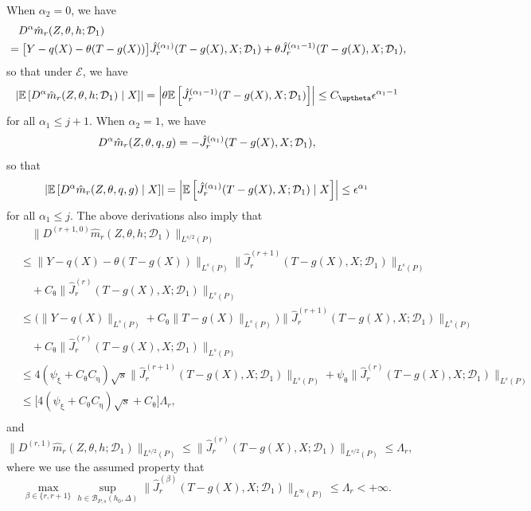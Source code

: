 \documentclass{article}
\def\eps{{\epsilon}}
\def\gB{{\mathcal{B}}}
\def\gD{{\mathcal{D}}}
\def\gE{{\mathcal{E}}}
\newcommand{\E}{\mathbb{E}}
\begin{document}
When $\alpha_2=0$, we have
\begin{equation}
    \notag
    \begin{aligned}
        &\quad D^{\alpha}\hat{m}_r(Z,\theta,h;\gD_1) \\
        &= \big[Y-q(X)-\theta(T-g(X))\big]\hat{J}_r^{(\alpha_1)}(T-g(X),X;\gD_1) + \theta \hat{J}_r^{(\alpha_1-1)}(T-g(X),X;\gD_1),
    \end{aligned}
\end{equation}
so that under $\gE$, we have
\begin{equation}
    \notag
    \left|\E\left[ D^{\alpha}\hat{m}_r(Z,\theta,h;\gD_1)\mid X\right]\right| = \left|\theta \E\left[ \hat{J}_r^{(\alpha_1-1)}(T-g(X),X;\gD_1) \right]\right| \leq C_{\uptheta}\eps^{\alpha_1-1}
\end{equation}
for all $\alpha_1 \leq j+1$. When $\alpha_2=1$, we have
\begin{equation}
    \notag
    D^{\alpha}\hat{m}_r(Z,\theta,q,g) = - \hat{J}_r^{(\alpha_1)}(T-g(X),X;\gD_1),
\end{equation}
so that
\begin{equation}
    \notag
    \left|\E\left[ D^{\alpha}\hat{m}_r(Z,\theta,q,g)\mid X\right]\right| = \left|\E\left[ \hat{J}_r^{(\alpha_1)}(T-g(X),X;\gD_1) \mid X \right]\right| \leq \eps^{\alpha_1}
\end{equation}
for all $\alpha_1 \leq j$. The above derivations also imply that
\begin{equation}
    \label{eq:Jk-derivative-sup-norm}
    \begin{aligned}
        &\quad \|D^{(r+1,0)}\hat{m}_r(Z,\theta,h;\gD_1)\|_{L^{s/2}(P)} \\
        &\leq \|Y-q(X)-\theta(T-g(X))\|_{L^s(P)}\|\hat{J}_r^{(r+1)}(T-g(X),X;\gD_1)\big\|_{L^{s}(P)} \\&\quad + C_{\uptheta}\|\hat{J}_r^{(r)}(T-g(X),X;\gD_1)\big\|_{L^{s}(P)} \\
        &\leq \big(\|Y-q(X)\|_{L^s(P)}+ C_{\uptheta}\|T-g(X)\|_{L^s(P)}\big)\|\hat{J}_r^{(r+1)}(T-g(X),X;\gD_1)\big\|_{L^{s}(P)} \\
        &\quad + C_{\uptheta}\|\hat{J}_r^{(r)}(T-g(X),X;\gD_1)\big\|_{L^{s}(P)} \\
        &\leq 4(\psi_{\upxi}+C_{\uptheta}C_{\upeta})\sqrt{s}\big\|\hat{J}_r^{(r+1)}(T-g(X),X;\gD_1)\big\|_{L^{s}(P)}  + \psi_{\uptheta} \big\|\hat{J}_r^{(r)}(T-g(X),X;\gD_1)\big\|_{L^{s}(P)} \\
        &\leq \big[4(\psi_{\upxi}+C_{\uptheta}C_{\upeta})\sqrt{s} + C_{\uptheta}\big]\Lambda_r, \\
    \end{aligned}
\end{equation}
and
\begin{equation}
    \|D^{(r,1)}\hat{m}_r(Z,\theta,h;\gD_1)\|_{L^{s/2}(P)} \leq \big\|\hat{J}_r^{(r)}(T-g(X),X;\gD_1)\big\|_{L^{s/2}(P)} \leq \Lambda_r,
\end{equation}
where we use the assumed property that $$\max_{\beta\in\{r,r+1\}}\sup_{h\in\gB_{P,s}(h_0,\Delta)} \big\|\hat{J}_r^{(\beta)}(T-g(X),X;\gD_1)\big\|_{L^{\infty}(P)} \leq \Lambda_r < +\infty.$$
\end{document}

